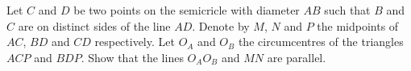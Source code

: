 Let $C$ and $D$ be two points on the semicricle with diameter $AB$ such that $B$ and $C$ are on distinct sides of the line $AD$. Denote by $M$,  $N$ and $P$ the midpoints of $AC$,  $BD$ and $CD$ respectively. Let $O_A$ and $O_B$ the circumcentres of the triangles $ACP$ and $BDP$. Show that the lines $O_AO_B$ and $MN$ are parallel.